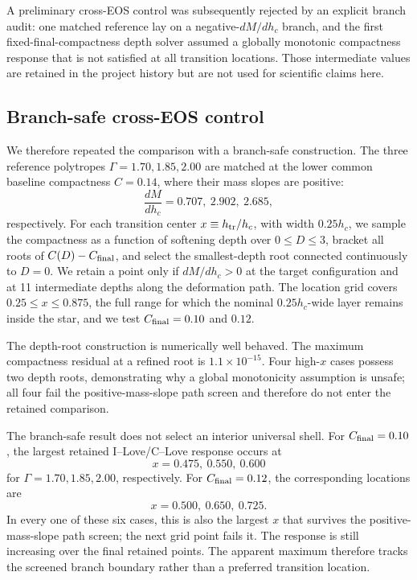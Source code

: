 

A preliminary cross-EOS control was subsequently rejected by an explicit
branch audit: one matched reference lay on a negative-\(dM/dh_c\) branch,
and the first fixed-final-compactness depth solver assumed a globally
monotonic compactness response that is not satisfied at all transition
locations.  Those intermediate values are retained in the project history
but are not used for scientific claims here.

\subsection{Branch-safe cross-EOS control}

We therefore repeated the comparison with a branch-safe construction.  The
three reference polytropes \(\Gamma=1.70,1.85,2.00\) are matched at the
lower common baseline compactness \(C=0.14\), where their mass slopes are
positive:
\begin{equation}
 \frac{dM}{dh_c}=0.707,\ 2.902,\ 2.685,
\end{equation}
respectively.  For each transition center
\(x\equiv h_{\rm tr}/h_c\), with width \(0.25h_c\), we sample the
compactness as a function of softening depth over \(0\le D\le3\), bracket
all roots of \(C(D)-C_{\rm final}\), and select the smallest-depth root
connected continuously to \(D=0\).  We retain a point only if
\(dM/dh_c>0\) at the target configuration and at 11 intermediate depths
along the deformation path.  The location grid covers
\(0.25\le x\le0.875\), the full range for which the nominal
\(0.25h_c\)-wide layer remains inside the star, and we test
\(C_{\rm final}=0.10\) and \(0.12\).

The depth-root construction is numerically well behaved.  The maximum
compactness residual at a refined root is \(1.1\times10^{-15}\).  Four
high-\(x\) cases possess two depth roots, demonstrating why a global
monotonicity assumption is unsafe; all four fail the positive-mass-slope
path screen and therefore do not enter the retained comparison.

The branch-safe result does not select an interior universal shell.  For
\(C_{\rm final}=0.10\), the largest retained I--Love/C--Love response
occurs at
\[
 x=0.475,\ 0.550,\ 0.600
\]
for \(\Gamma=1.70,1.85,2.00\), respectively.  For
\(C_{\rm final}=0.12\), the corresponding locations are
\[
 x=0.500,\ 0.650,\ 0.725.
\]
In every one of these six cases, this is also the largest \(x\) that
survives the positive-mass-slope path screen; the next grid point fails it.
The response is still increasing over the final retained points.  The
apparent maximum therefore tracks the screened branch boundary rather than
a preferred transition location.

